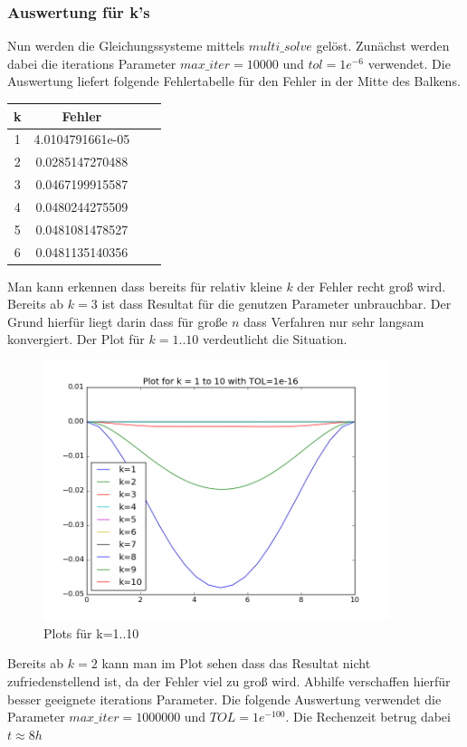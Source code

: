 \documentclass[12pt,titlepage]{article}
\begin{document}
	 	\subsubsection{Auswertung für k's}
	 		Nun werden die Gleichungssysteme mittels $multi\_solve$ gelöst. Zunächst werden dabei die iterations Parameter $max\_iter=10000$ und $tol=1e^{-6}$ verwendet. Die Auswertung liefert folgende Fehlertabelle für den Fehler in der Mitte des Balkens.	 		
			\begin{table}[!h]
				\centering
				\begin{tabular}{c c c c}
					\bf k & \bf Fehler\\
					\hline
					1	& 4.0104791661e-05 \\ 
					2   & 0.0285147270488 \\
					3	& 0.0467199915587 \\
					4	& 0.0480244275509\\
					5   & 0.0481081478527\\
					6	& 0.0481135140356\\
				\end{tabular}
			\end{table}
			Man kann erkennen dass bereits für relativ kleine $k$ der Fehler recht groß wird. Bereits ab $k=3$ ist dass Resultat für die genutzen Parameter unbrauchbar. Der Grund hierfür liegt darin dass für große $n$ dass Verfahren nur sehr langsam konvergiert. Der Plot für $k=1..10$ verdeutlicht die Situation.
		 	\begin{figure}[H] 
	 			\centering
	 			\includegraphics[width=0.9\textwidth]{ks.png}
	 			\caption{Plots für k=1..10}
	 			\label{fig:Bild2}
	 		\end{figure}
	 		Bereits ab $k=2$ kann man im Plot sehen dass das Resultat nicht zufriedenstellend ist, da der Fehler viel zu groß wird. Abhilfe verschaffen hierfür besser geeignete iterations Parameter. Die folgende Auswertung verwendet die Parameter $max\_iter=1000000$ und $TOL = 1e^{-100}$. Die Rechenzeit betrug dabei $t \approx 8h$
\end{document}
